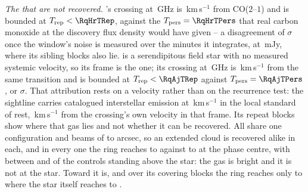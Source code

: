 \emph{The \MkAttrExcl{} that are not recovered.} \RqHrStar's crossing at
\RqHrFreq\,GHz is \RqHrDv\,km\,s$^{-1}$ from CO($2$--$1$) and is bounded at
$T_{\rm rep}<\RqHrTRep$, against the $T_{\rm pers}=\RqHrTPers$ that real
carbon monoxide at the discovery flux density would have given -- a disagreement of
\RqHrExcl$\sigma$ once the window's noise is measured over the
\RqHrOnsMin{} minutes it integrates, at \RqHrRms\,mJy, where its sibling
blocks also lie. \RqAjStar{} is a serendipitous field star with no measured
systemic velocity, so its frame is the \RqAjFrame{} one; its crossing at
\RqAjFreq\,GHz is \RqAjDv\,km\,s$^{-1}$ from the same transition and is
bounded at $T_{\rm rep}<\RqAjTRep$ against $T_{\rm pers}=\RqAjTPers$, or
\RqAjExcl$\sigma$. That attribution rests on a velocity rather than on the
recurrence test: the sightline carries catalogued interstellar emission at
\LsLupVco\,km\,s$^{-1}$ in the local standard of rest,
\LsLupDv\,km\,s$^{-1}$ from the crossing's own velocity in that frame.
Its repeat blocks show where that gas lies and not whether it can be
recovered. All \RqAjNRep{} share one \RqAjArray{} configuration and beams of
\RqAjBeamLo{} to \RqAjBeamHi{} arcsec, so an extended cloud is recovered
alike in each, and in every one the ring reaches \RqAjCtrlLo{} to
\RqAjCtrlHi{} against \RqAjStarLo{} to \RqAjStarHi{} at the phase centre,
with between \RqAjNgeLo{} and \RqAjNgeHi{} of the \NCtrl{} controls standing
above the star: the gas is bright and it is not at the star. Toward
\RqRecurCloudStars{} it is, and over its \RqCtlNBlock{} covering blocks the
ring reaches only \RqCtlRingLo{} to \RqCtlRingHi{} where the star itself
reaches \RqCtlStarLo{} to \RqCtlStarHi.
